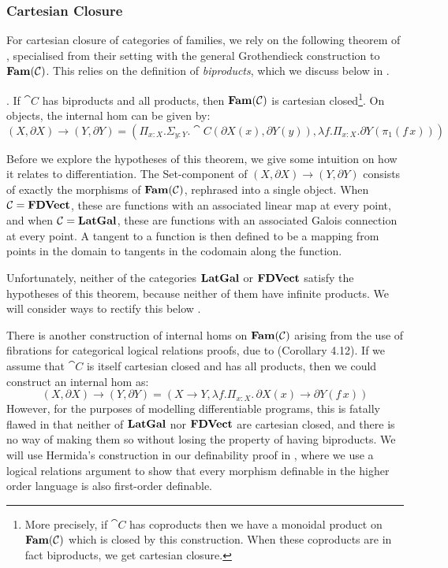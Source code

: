 \subsubsection{Cartesian Closure}

For cartesian closure of categories of families, we rely on the
following theorem of \citet{nunes2023}, specialised from their setting
with the general Grothendieck construction to $\mathbf{Fam}(\mathcal{C})$. This
relies on the definition of \emph{biproducts}, which we discuss below
in .

\begin{theorem}
  \label{thm:fam-closed}
  \AGDA.  If $\cat{C}$ has biproducts and all products, then
  $\mathbf{Fam}(\mathcal{C})$ is cartesian closed\footnote{More precisely, if
    $\cat{C}$ has coproducts then we have a monoidal product on
    $\mathbf{Fam}(\mathcal{C})$ which is closed by this construction. When these
    coproducts are in fact biproducts, we get cartesian closure.}. On
  objects, the internal hom can be given by:
  \begin{displaymath}
    (X, \partial X) \to (Y, \partial Y) = (\Pi_{x : X}. \Sigma_{y : Y}. \cat{C}(\partial X(x), \partial Y(y)), \lambda f. \Pi_{x : X}. \partial Y(\pi_1(f\, x)))
  \end{displaymath}
\end{theorem}

Before we explore the hypotheses of this theorem, we give some
intuition on how it relates to differentiation. The Set-component of
$(X, \partial X) \to (Y, \partial Y)$ consists of exactly the
morphisms of $\mathbf{Fam}(\mathcal{C})$, rephrased into a single object. When
$\mathcal{C} = \mathbf{FDVect}$, these are functions with an associated linear
map at every point, and when $\mathcal{C} = \mathbf{LatGal}$, these are functions
with an associated Galois connection at every point. A tangent to a
function is then defined to be a mapping from points in the domain to
tangents in the codomain along the function.

Unfortunately, neither of the categories $\mathbf{LatGal}$ or $\mathbf{FDVect}$
satisfy the hypotheses of this theorem, because neither of them have
infinite products. We will consider ways to rectify this below
.

There is another construction of internal homs on $\mathbf{Fam}(\mathcal{C})$
arising from the use of fibrations for categorical logical relations
proofs, due to \citet{hermida99} (Corollary 4.12). If we assume that
$\cat{C}$ is itself cartesian closed and has all products, then we
could construct an internal hom as:
\begin{displaymath}
  (X, \partial X) \to (Y, \partial Y) = (X \to Y, \lambda f. \Pi_{x : X}.\,\partial X(x) \to \partial Y(f\,x))
\end{displaymath}
However, for the purposes of modelling differentiable programs, this
is fatally flawed in that neither of $\mathbf{LatGal}$ nor $\mathbf{FDVect}$ are
cartesian closed, and there is no way of making them so without losing
the property of having biproducts. We will use Hermida's construction
in our definability proof in , where we use a
logical relations argument to show that every morphism definable in
the higher order language is also first-order definable.


